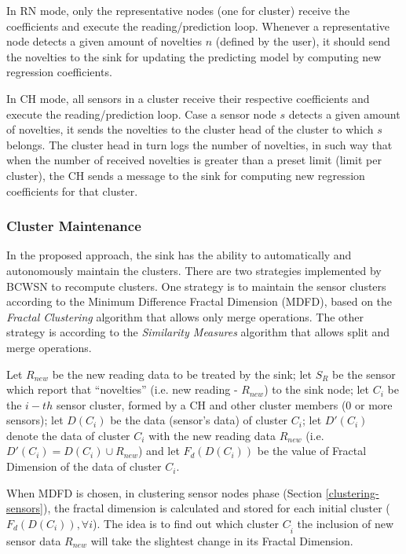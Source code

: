 \documentclass[conference]{IEEEtran}
\begin{document}
In RN mode, only the representative nodes (one for cluster)  receive the
coefficients and execute the reading/prediction loop. Whenever a representative
node detects a given amount of novelties $n$ (defined by the user), it should
send the novelties to the sink for updating the predicting model by computing
new regression coefficients.

In CH mode, all sensors in a cluster receive their respective coefficients and
execute the reading/prediction loop. Case a sensor node $s$ detects a given
amount of novelties, it sends the novelties to the cluster head of the cluster
to which $s$ belongs. The cluster head in turn logs the number of novelties, in
such way that when the number of received novelties is greater than  a preset
limit (limit per cluster), the CH sends a message to the sink for computing new
regression coefficients for that cluster.


\subsubsection{Cluster Maintenance}

In the proposed approach, the sink has the ability to automatically and
autonomously maintain the clusters. There are two strategies implemented by
BCWSN to recompute clusters. One strategy is to maintain the sensor clusters
according to the Minimum Difference Fractal Dimension (MDFD), based on the
\textit{Fractal Clustering} algorithm that allows only merge operations. The
other strategy is according to the \textit{Similarity Measures} algorithm that
allows split and merge operations.

Let $R_{new}$ be the new reading data to be treated by the sink; let $S_{R}$ be
the sensor which report that ``novelties'' (i.e. new reading - $R_{new}$) to the
sink node; let $C_i$ be the $i-th$ sensor cluster, formed by a 
CH and other cluster members (0 or more sensors); let $D(C_i)$
be the data (sensor's data) of cluster $C_i$; let $D'(C_i)$ denote the data of
cluster $C_i$ with the new reading data $R_{new}$ (i.e. $D'(C_i) = D(C_i) \cup
R_{new}$) and let $F_{d}(D(C_i))$ be the value of Fractal Dimension of the data
of cluster $C_i$.

When MDFD is chosen, in clustering sensor nodes phase (Section
\ref{clustering-sensors}), the fractal dimension is calculated and stored for
each initial cluster ($F_{d}(D(C_i)), \forall i$). The idea is to find out which
cluster $C_{\hat{i}}$ the inclusion of new sensor data $R_{new}$ will take the
slightest change in its Fractal Dimension.
\end{document}
